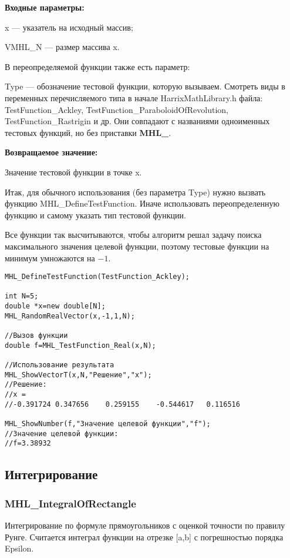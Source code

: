 \documentclass[a4paper,12pt]{article}
\begin{document}
\textbf{Входные параметры:}

x --- указатель на исходный массив;

VMHL\_N --- размер массива x.

В переопределяемой функции также есть параметр:
  
Type --- обозначение тестовой функции, которую вызываем.
Смотреть виды в переменных перечисляемого типа в начале HarrixMathLibrary.h файла: TestFunction\_Ackley, TestFunction\_ParaboloidOfRevolution, TestFunction\_Rastrigin и др. Они совпадают с названиями одноименных тестовых функций, но без приставки \textbf{MHL\_}.

\textbf{Возвращаемое значение:}
 
Значение тестовой функции в точке x.

Итак, для обычного использования (без параметра Type) нужно вызвать функцию MHL\_DefineTestFunction. Иначе использовать переопределенную функцию и самому указать тип тестовой функции.

Все функции так высчитываются, чтобы алгоритм решал задачу поиска максимального значения целевой функции, поэтому тестовые функции на минимум умножаются на $-1$.


\begin{lstlisting}[label=code_use_MHL_TestFunction_Real,caption=Пример использования]
MHL_DefineTestFunction(TestFunction_Ackley);

int N=5;
double *x=new double[N];
MHL_RandomRealVector(x,-1,1,N);

//Вызов функции
double f=MHL_TestFunction_Real(x,N);

//Использование результата
MHL_ShowVectorT(x,N,"Решение","x");
//Решение:
//x =
//-0.391724	0.347656	0.259155	-0.544617	0.116516

MHL_ShowNumber(f,"Значение целевой функции","f");
//Значение целевой функции:
//f=3.38932
\end{lstlisting}

\subsection{Интегрирование}

\subsubsection{MHL\_IntegralOfRectangle}\label{MHL_IntegralOfRectangle}

Интегрирование по формуле прямоугольников с оценкой точности по правилу Рунге. Считается интеграл функции на отрезке [a,b] с погрешностью порядка Epsilon.
\end{document}
